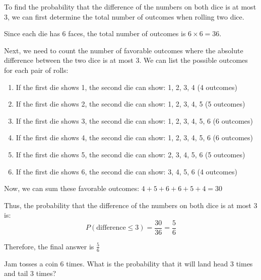 \documentclass[a4paper, 10pt]{article}
\begin{document}
\begin{solution}
	To find the probability that the difference of the numbers on both dice is at most 3,
	we can first determine the total number of outcomes when rolling two dice.
	
	\myspace

	\par Since each die has 6 faces, the total number of outcomes is \( 6 \times 6 = 36 \).
	
	\myspace

	\par Next, we need to count the number of favorable outcomes where the absolute difference between the two dice is at most 3.
	We can list the possible outcomes for each pair of rolls:
	\begin{enumerate}
		\item If the first die shows 1, the second die can show: 1, 2, 3, 4 (4 outcomes)
		\item If the first die shows 2, the second die can show: 1, 2, 3, 4, 5 (5 outcomes)
		\item If the first die shows 3, the second die can show: 1, 2, 3, 4, 5, 6 (6 outcomes)
		\item If the first die shows 4, the second die can show: 1, 2, 3, 4, 5, 6 (6 outcomes)
		\item If the first die shows 5, the second die can show: 2, 3, 4, 5, 6 (5 outcomes)
		\item If the first die shows 6, the second die can show: 3, 4, 5, 6 (4 outcomes)
	\end{enumerate}

	Now, we can sum these favorable outcomes: \( 4 + 5 + 6 + 6 + 5 + 4 = 30 \)

	Thus, the probability that the difference of the numbers on both dice is at most 3 is:
	\[
		P(\text{difference} \leq 3) = \frac{30}{36} = \frac{5}{6}
	\]

	Therefore, the final answer is \( \boxed{\frac{5}{6}} \)
\end{solution}

\begin{problem}
Jam tosses a coin 6 times.
What is the probability that it will land head 3 times and tail 3 times?
\end{problem}
\end{document}
